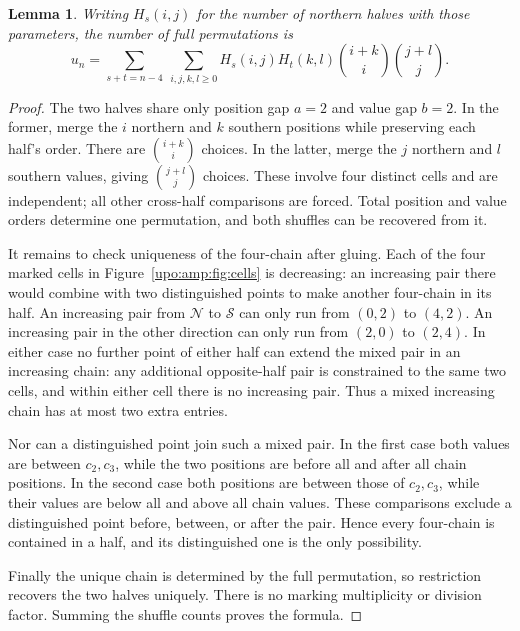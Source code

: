 \documentclass[11pt,letterpaper]{article}
\newtheorem{lemma}[theorem]{Lemma}
\theoremstyle{remark}\newtheorem{remark}[theorem]{Remark}
\numberwithin{equation}{section}
\begin{document}
\begin{lemma}\label{upo:amp:lem:gluing}
Writing $H_s(i,j)$ for the number of northern halves with those parameters,
the number of full permutations is
\begin{equation}\label{upo:amp:eq:gluing}
u_n=\sum_{s+t=n-4}\ \sum_{i,j,k,l\ge0}
H_s(i,j)H_t(k,l)\binom{i+k}{i}\binom{j+l}{j}.
\end{equation}
\end{lemma}
\begin{proof}
The two halves share only position gap $a=2$ and value gap $b=2$.
In the former, merge the $i$ northern and $k$ southern positions while
preserving each half's order. There are $\binom{i+k}{i}$ choices.
In the latter, merge the $j$ northern and $l$ southern values, giving
$\binom{j+l}{j}$ choices. These involve four distinct cells and are
independent; all other cross-half comparisons are forced. Total position
and value orders determine one permutation, and both shuffles can be
recovered from it.

It remains to check uniqueness of the four-chain after gluing. Each of the
four marked cells in Figure~\ref{upo:amp:fig:cells} is decreasing: an increasing
pair there would combine with two distinguished points to make another
four-chain in its half. An increasing pair from $\mathcal N$ to $\mathcal S$
can only run from $(0,2)$ to $(4,2)$. An increasing pair in the other
direction can only run from $(2,0)$ to $(2,4)$. In either case no further
point of either half can extend the mixed pair in an increasing chain:
any additional opposite-half pair is constrained to the same two cells,
and within either cell there is no increasing pair. Thus a mixed increasing
chain has at most two extra entries.

Nor can a distinguished point join such a mixed pair. In the first case
both values are between $c_2,c_3$, while the two positions are before all
and after all chain positions. In the second case both positions are
between those of $c_2,c_3$, while their values are below all and above all
chain values. These comparisons exclude a distinguished point before,
between, or after the pair. Hence every four-chain is contained in a half,
and its distinguished one is the only possibility.

Finally the unique chain is determined by the full permutation, so
restriction recovers the two halves uniquely. There is no marking
multiplicity or division factor. Summing the shuffle counts proves the
formula.
\end{proof}
\end{document}
